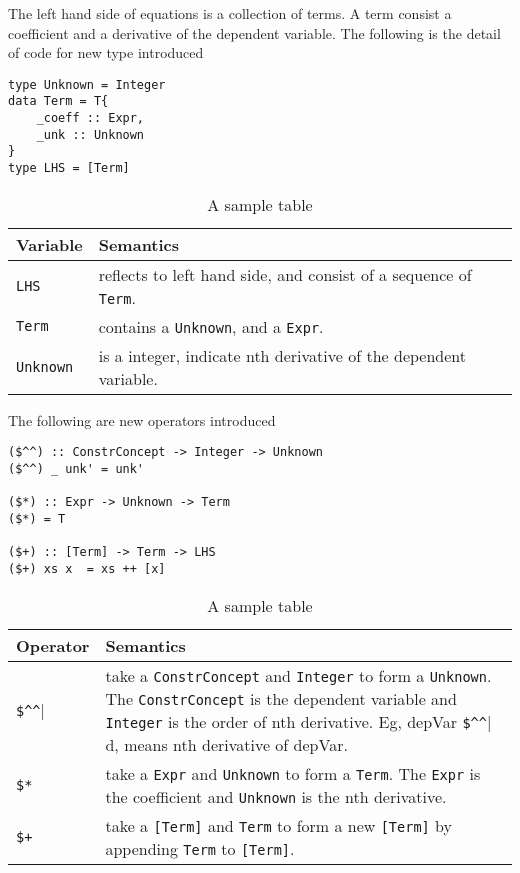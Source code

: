 The left hand side of equations is a collection of terms. A term consist a coefficient and a derivative of the dependent variable. The following is the detail of code for new type introduced

\begin{lstlisting}[language=HaskellUlisses]
type Unknown = Integer
data Term = T{
	_coeff :: Expr,
	_unk :: Unknown
}
type LHS = [Term]
\end{lstlisting}


\begin{table}
	\begin{tabular}{ p{} p{} }
		\textbf{Variable} & \textbf{Semantics} \\
		\toprule
		\verb|LHS| & reflects to left hand side, and consist of a sequence of \verb|Term|.\\
		\verb|Term| & contains a \verb|Unknown|, and a \verb|Expr|.\\
		\verb|Unknown| & is a integer, indicate nth derivative of the dependent variable.\\
		\bottomrule	
	\end{tabular}	
	\caption{A sample table}	
	\label{tab_inputtype}
\end{table}

The following are new operators introduced
\begin{lstlisting}[language=HaskellUlisses]
($^^) :: ConstrConcept -> Integer -> Unknown
($^^) _ unk' = unk'

($*) :: Expr -> Unknown -> Term
($*) = T

($+) :: [Term] -> Term -> LHS
($+) xs x  = xs ++ [x]
\end{lstlisting}

\begin{table}
	\begin{tabular}{ p{} p{} }
		\textbf{Operator} & \textbf{Semantics} \\
		\toprule
		\verb|$^^| & take a \verb|ConstrConcept| and \verb|Integer| to form a \verb|Unknown|. The \verb|ConstrConcept| is the dependent variable and \verb|Integer| is the order of nth derivative. Eg, depVar \verb|$^^| d, means nth derivative of depVar.\\
		\verb|$*| & take a \verb|Expr| and \verb|Unknown| to form a \verb|Term|. The \verb|Expr| is the coefficient and \verb|Unknown| is the nth derivative.\\
		\verb|$+| & take a \verb|[Term]| and \verb|Term| to form a new \verb|[Term]| by appending \verb|Term| to \verb|[Term]|.\\
		\bottomrule	
	\end{tabular}	
	\caption{A sample table}	
	\label{tab_inputtype}
\end{table}

